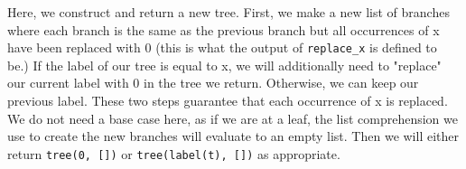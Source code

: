 \begin{blocksection}
\begin{solution}
Here, we construct and return a new tree. First, we make 
a new list of branches where each branch is the same
as the previous branch but all occurrences of x have been
replaced with 0 (this is what the output of \lstinline$replace_x$
is defined to be.)
\newline
\newline
If the label of our tree is equal to x, we will additionally need 
to "replace" our current label with 0 in the tree we return. Otherwise,
we can keep our previous label.
\newline
\newline
These two steps guarantee that each occurrence of x is replaced.
\newline
\newline
We do not need a base case here, as if we are at a leaf, the list
comprehension we use to create the new branches will evaluate to an 
empty list. Then we will either return \lstinline$tree(0, [])$ or
\lstinline$tree(label(t), [])$ as appropriate. 
\end{solution}
\end{blocksection}


